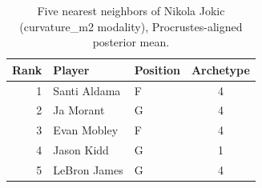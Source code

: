 \begin{table}[htbp]
  \centering\small
  \begin{tabular}{rllc}
    \toprule
    Rank & Player & Position & Archetype \\
    \midrule
    1 & Santi Aldama & F & 4 \\
    2 & Ja Morant & G & 4 \\
    3 & Evan Mobley & F & 4 \\
    4 & Jason Kidd & G & 1 \\
    5 & LeBron James & G & 4 \\
    \bottomrule
  \end{tabular}
  \caption{Five nearest neighbors of Nikola Jokic (curvature_m2 modality), Procrustes-aligned posterior mean.}
  \label{tab:Nikola_Jokic_neighbors_curvature_m2}
\end{table}

